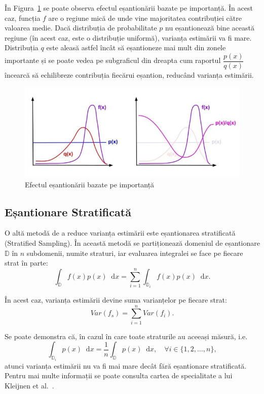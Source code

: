 \documentclass[12pt,a4paper]{report}
\newcommand*\diff{\mathop{}\!\mathrm{d}}
\numberwithin{equation}{section} %
\begin{document}
În Figura~\ref{fig:is} se poate observa efectul eșantionării bazate pe importanță.
În acest caz, funcția $f$ are o regiune mică de unde vine majoritatea contribuției
către valoarea medie. Dacă distribuția de probabilitate $p$ nu eșantionează bine
această regiune (în acest caz, este o distribuție uniformă), varianța estimării
va fi mare. Distribuția $q$ este aleasă astfel încât să eșantioneze mai mult din
zonele importante și se poate vedea pe subgraficul din dreapta cum raportul
$\dfrac{p(x)}{q(x)}$ încearcă să echilibreze contribuția fiecărui eșantion, reducând
varianța estimării.

\begin{figure}[th]
	\centering
	\includegraphics[width=\textwidth]{pics/is.png}
	\caption{Efectul eșantionării bazate pe importanță\protect\footnotemark}
	\label{fig:is}
\end{figure}

\subsection{Eșantionare Stratificată}\label{sec:stratified}

O altă metodă de a reduce varianța estimării este eșantionarea stratificată (Stratified Sampling).
În această metodă se partiționează domeniul de eșantionare $\mathbb{D}$ în $n$ subdomenii,
numite straturi, iar evaluarea integralei se face pe fiecare strat în parte:
\begin{equation}
	\int_{\mathbb{D}} f(x) p(x)\diff x = \sum_{i=1}^{n} \int_{\mathbb{D}_i} f(x) p(x)\diff x.
\end{equation}

În acest caz, varianța estimării devine suma varianțelor pe fiecare strat:
\begin{equation}
	Var(f_s) = \sum_{i=1}^{n} Var(f_i).
\end{equation}

Se poate demonstra că, în cazul în care toate straturile au aceeași măsură, i.e.
\begin{equation}
	\int_{\mathbb{D}_i} p(x)\diff x = \frac{1}{n}\int_{\mathbb{D}} p(x)\diff x, \quad \forall i \in \{1, 2, \ldots, n\},
\end{equation}
atunci varianța estimării nu va fi mai mare decât fără eșantionare stratificată.
Pentru mai multe informații se poate consulta cartea de specialitate a lui Kleijnen et al.~\cite{Kleijnen2013}.
\end{document}
